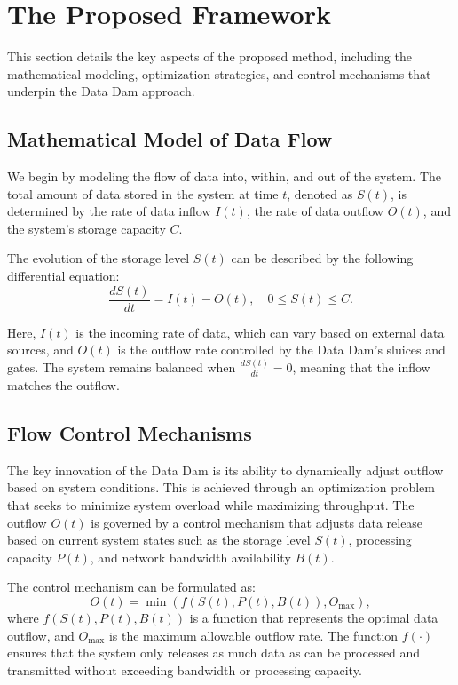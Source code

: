\section{The Proposed Framework}
This section details the key aspects of the proposed method, including the mathematical modeling, optimization strategies, and control mechanisms that underpin the Data Dam approach.

\subsection{Mathematical Model of Data Flow}

We begin by modeling the flow of data into, within, and out of the system. The total amount of data stored in the system at time \( t \), denoted as \( S(t) \), is determined by the rate of data inflow \( I(t) \), the rate of data outflow \( O(t) \), and the system’s storage capacity \( C \).

The evolution of the storage level \( S(t) \) can be described by the following differential equation:
\begin{equation}
\frac{dS(t)}{dt} = I(t) - O(t), \quad 0 \leq S(t) \leq C.
\end{equation}

Here, \( I(t) \) is the incoming rate of data, which can vary based on external data sources, and \( O(t) \) is the outflow rate controlled by the Data Dam's sluices and gates. The system remains balanced when \( \frac{dS(t)}{dt} = 0 \), meaning that the inflow matches the outflow.

\subsection{Flow Control Mechanisms}

The key innovation of the Data Dam is its ability to dynamically adjust outflow based on system conditions. This is achieved through an optimization problem that seeks to minimize system overload while maximizing throughput. The outflow \( O(t) \) is governed by a control mechanism that adjusts data release based on current system states such as the storage level \( S(t) \), processing capacity \( P(t) \), and network bandwidth availability \( B(t) \).

The control mechanism can be formulated as:
\begin{equation}
O(t) = \min \left( f(S(t), P(t), B(t)), O_{\max} \right),
\end{equation}
where \( f(S(t), P(t), B(t)) \) is a function that represents the optimal data outflow, and \( O_{\max} \) is the maximum allowable outflow rate. The function \( f(\cdot) \) ensures that the system only releases as much data as can be processed and transmitted without exceeding bandwidth or processing capacity.

